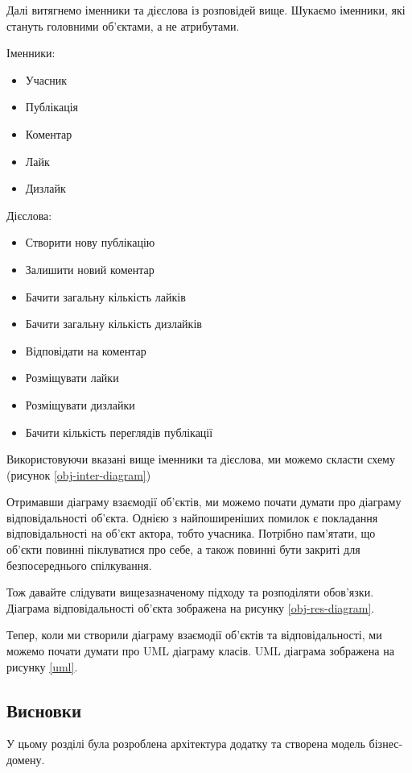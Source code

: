 Далі витягнемо іменники та дієслова із розповідей вище.
Шукаємо іменники, які стануть головними об'єктами, а не атрибутами.

Іменники:
\begin{itemize}
		\item Учасник
		\item Публікація
		\item Коментар
		\item Лайк
		\item Дизлайк
\end{itemize}

Дієслова:
\begin{itemize}
		\item Створити нову публікацію
		\item Залишити новий коментар
		\item Бачити загальну кількість лайків
		\item Бачити загальну кількість дизлайків
		\item Відповідати на коментар
		\item Розміщувати лайки
		\item Розміщувати дизлайки
		\item Бачити кількість переглядів публікації
\end{itemize}

Використовуючи вказані вище іменники та дієслова, ми можемо скласти схему (рисунок \ref{obj-inter-diagram})

Отримавши діаграму взаємодії об'єктів, ми можемо почати думати про діаграму відповідальності об'єкта.
Однією з найпоширеніших помилок є покладання відповідальності на об'єкт актора, тобто учасника.
Потрібно пам'ятати, що об'єкти повинні піклуватися про себе,
а також повинні бути закриті для безпосереднього спілкування.

Тож давайте слідувати вищезазначеному підходу та розподіляти обов'язки.
Діаграма відповідальності об'єкта зображена на рисунку \ref{obj-res-diagram}.

Тепер, коли ми створили діаграму взаємодії об'єктів та відповідальності,
ми можемо почати думати про UML діаграму класів. 
UML діаграма зображена на рисунку \ref{uml}.

\subsection{Висновки}
У цьому розділі була розроблена архітектура додатку та створена модель бізнес-домену.
